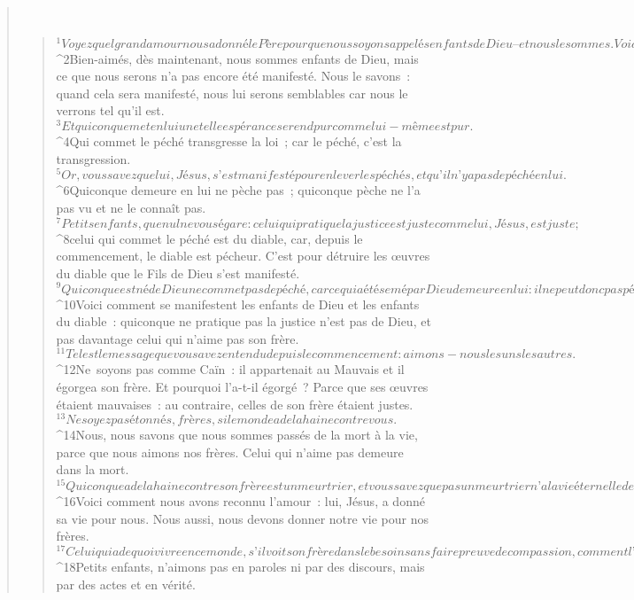\begin{verse}
         
      \bchapter{}
      \begin{verse}
${}^{1}Voyez quel grand amour nous a donné le Père pour que nous soyons appelés enfants de Dieu  – et nous le sommes. Voici pourquoi le monde ne nous connaît pas : c’est qu’il n’a pas connu Dieu. 
${}^{2}Bien-aimés, dès maintenant, nous sommes enfants de Dieu, mais ce que nous serons n’a pas encore été manifesté. Nous le savons : quand cela sera manifesté, nous lui serons semblables car nous le verrons tel qu’il est. 
${}^{3}Et quiconque met en lui une telle espérance se rend pur comme lui-même est pur.
${}^{4}Qui commet le péché transgresse la loi ; car le péché, c’est la transgression. 
${}^{5}Or, vous savez que lui, Jésus, s’est manifesté pour enlever les péchés, et qu’il n’y a pas de péché en lui. 
${}^{6}Quiconque demeure en lui ne pèche pas ; quiconque pèche ne l’a pas vu et ne le connaît pas.
${}^{7}Petits enfants, que nul ne vous égare : celui qui pratique la justice est juste comme lui, Jésus, est juste ; 
${}^{8}celui qui commet le péché est du diable, car, depuis le commencement, le diable est pécheur. C’est pour détruire les œuvres du diable que le Fils de Dieu s’est manifesté. 
${}^{9}Quiconque est né de Dieu ne commet pas de péché, car ce qui a été semé par Dieu demeure en lui : il ne peut donc pas pécher, puisqu’il est né de Dieu. 
${}^{10}Voici comment se manifestent les enfants de Dieu et les enfants du diable : quiconque ne pratique pas la justice n’est pas de Dieu, et pas davantage celui qui n’aime pas son frère.
${}^{11}Tel est le message que vous avez entendu depuis le commencement : aimons-nous les uns les autres. 
${}^{12}Ne soyons pas comme Caïn : il appartenait au Mauvais et il égorgea son frère. Et pourquoi l’a-t-il égorgé ? Parce que ses œuvres étaient mauvaises : au contraire, celles de son frère étaient justes.
${}^{13}Ne soyez pas étonnés, frères, si le monde a de la haine contre vous. 
${}^{14}Nous, nous savons que nous sommes passés de la mort à la vie, parce que nous aimons nos frères. Celui qui n’aime pas demeure dans la mort. 
${}^{15}Quiconque a de la haine contre son frère est un meurtrier, et vous savez que pas un meurtrier n’a la vie éternelle demeurant en lui. 
${}^{16}Voici comment nous avons reconnu l’amour : lui, Jésus, a donné sa vie pour nous. Nous aussi, nous devons donner notre vie pour nos frères. 
${}^{17}Celui qui a de quoi vivre en ce monde, s’il voit son frère dans le besoin sans faire preuve de compassion, comment l’amour de Dieu pourrait-il demeurer en lui ? 
${}^{18}Petits enfants, n’aimons pas en paroles ni par des discours, mais par des actes et en vérité.

\end{verse}
\end{verse}
